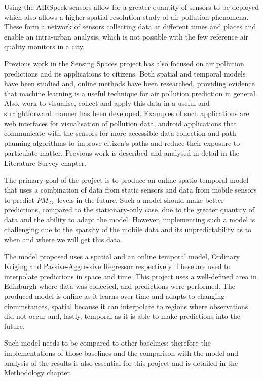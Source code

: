 Using the AIRSpeck sensors allow for a greater quantity of sensors to be deployed which also allows a higher spatial resolution study of air pollution phenomena. These form a network of sensors collecting data at different times and places and enable an intra-urban analysis, which is not possible with the few reference air quality monitors in a city.

Previous work in the Sensing Spaces project has also focused on air pollution predictions and its applications to citizens. Both spatial and temporal models have been studied and, online methods have been researched, providing evidence that machine learning is a useful technique for air pollution prediction in general. Also, work to visualise, collect and apply this data in a useful and straightforward manner has been developed. Examples of such applications are web interfaces for visualisation of pollution data, android applications that communicate with the sensors for more accessible data collection and path planning algorithms to improve citizen's paths and reduce their exposure to particulate matter. Previous work is described and analysed in detail in the Literature Survey chapter.

The primary goal of the project is to produce an online spatio-temporal model that uses a combination of data from static sensors and data from mobile sensors to predict $PM_{2.5}$ levels in the future. Such a model should make better predictions, compared to the stationary-only case, due to the greater quantity of data and the ability to adapt the model. However, implementing such a model is challenging due to the sparsity of the mobile data and its unpredictability as to when and where we will get this data.

The model proposed uses a spatial and an online temporal model, Ordinary Kriging and Passive-Aggressive Regressor respectively. These are used to interpolate predictions in space and time. This project uses a well-defined area in Edinburgh where data was collected, and predictions were performed. The produced model is online as it learns over time and adapts to changing circumstances, spatial because it can interpolate to regions where observations did not occur and, lastly, temporal as it is able to make predictions into the future.

Such model needs to be compared to other baselines; therefore the implementations of those baselines and the comparison with the model and analysis of the results is also essential for this project and is detailed in the Methodology chapter. 

